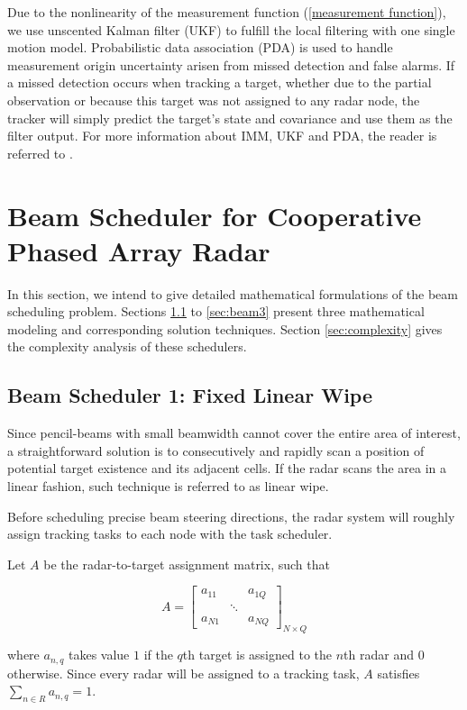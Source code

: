 \documentclass[12pt,journal,draftclsnofoot,onecolumn]{IEEEtran}
\begin{document}
Due to the nonlinearity of the measurement function (\ref{measurement function}), we use unscented Kalman filter (UKF) to fulfill the local filtering with one single motion model. Probabilistic data association (PDA) is used to handle measurement origin uncertainty arisen from missed detection and false alarms.
If a missed detection occurs when tracking a target, whether due to the partial observation or because this target was not assigned to any radar node, the tracker will simply predict the target's state and covariance and use them as the filter output. For more information about IMM, UKF and PDA, the reader is referred to \cite{bar2004estimation}.


\section{Beam Scheduler for Cooperative Phased Array Radar}
In this section, we intend to give detailed mathematical formulations of the beam scheduling problem. Sections \ref{sec:beam1} to \ref{sec:beam3} present three mathematical modeling and corresponding solution techniques. Section \ref{sec:complexity} gives the complexity analysis of these schedulers.

 
\subsection{Beam Scheduler 1: Fixed Linear Wipe}
\label{sec:beam1}
Since pencil-beams with small beamwidth cannot cover the entire area of interest, a straightforward solution is to consecutively and rapidly scan a position of potential target existence and its adjacent cells\cite{knott2012radar}. If the radar scans the area in a linear fashion, such technique is referred to as linear wipe.

Before scheduling precise beam steering directions, the radar system will roughly assign tracking tasks to each node with the task scheduler.

Let $A$ be the radar-to-target assignment matrix, such that 

\begin{equation} 
	A=\begin{bmatrix} a_{11} & & a_{1Q}\\ & \ddots & \\ a_{N1} & & a_{NQ} \end{bmatrix}_{N\times Q}  
\end{equation}

where $a_{n,q}$ takes value $1$ if the $q$th target is assigned to the $n$th radar and $0$ otherwise. Since every radar will be assigned to a tracking task, $A$ satisfies $\sum_{n\in R}a_{n,q}=1$.
\end{document}
